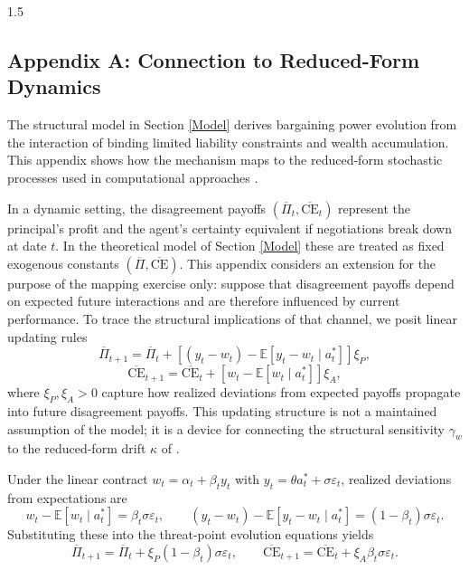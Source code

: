 \documentclass[12pt]{article}
\theoremstyle{definition}
\theoremstyle{plain}
\begin{document}
\begin{spacing}{1.5}
\newpage
\begin{appendices}
    \section{Appendix A: Connection to Reduced-Form Dynamics} \label{ReducedFormDynamics}

    The structural model in Section \ref{Model} derives bargaining power evolution from the interaction of binding limited liability constraints and wealth accumulation. This appendix shows how the mechanism maps to the reduced-form stochastic processes used in computational approaches \parencite{digiannatale2025}.
    
    In a dynamic setting, the disagreement payoffs $(\overline{\Pi}_t, \overline{\text{CE}}_t)$ represent the principal's profit and the agent's certainty equivalent if negotiations break down at date $t$. In the theoretical model of Section \ref{Model} these are treated as fixed exogenous constants $(\overline{\Pi}, \overline{\text{CE}})$. This appendix considers an extension for the purpose of the mapping exercise only: suppose that disagreement payoffs depend on expected future interactions and are therefore influenced by current performance. To trace the structural implications of that channel, we posit linear updating rules
    \[
    \overline{\Pi}_{t+1} = \overline{\Pi}_t + [(y_t - w_t) - \mathbb{E}[y_t - w_t \mid a_t^*]]\xi_P ,
    \]
    \[
    \overline{\text{CE}}_{t+1} = \overline{\text{CE}}_t + [w_t - \mathbb{E}[w_t \mid a_t^*]]\xi_A ,
    \]
    where $\xi_P, \xi_A > 0$ capture how realized deviations from expected payoffs propagate into future disagreement payoffs. This updating structure is not a maintained assumption of the model; it is a device for connecting the structural sensitivity $\gamma_w$ to the reduced-form drift $\kappa$ of \textcite{digiannatale2025}.
    
    Under the linear contract $w_t = \alpha_t + \beta_t y_t$ with $y_t = \theta a_t^* + \sigma \varepsilon_t$, realized deviations from expectations are
    \[
    w_t - \mathbb{E}[w_t \mid a_t^*] = \beta_t \sigma \varepsilon_t, \qquad (y_t - w_t) - \mathbb{E}[y_t - w_t \mid a_t^*] = (1-\beta_t) \sigma \varepsilon_t.
    \]
    Substituting these into the threat-point evolution equations yields
    \[
    \overline{\Pi}_{t+1} = \overline{\Pi}_t + \xi_P (1-\beta_t) \sigma \varepsilon_t, \qquad \overline{\text{CE}}_{t+1} = \overline{\text{CE}}_t + \xi_A \beta_t \sigma \varepsilon_t.
    \]
    

\end{appendices}
\end{spacing}
\end{document}
